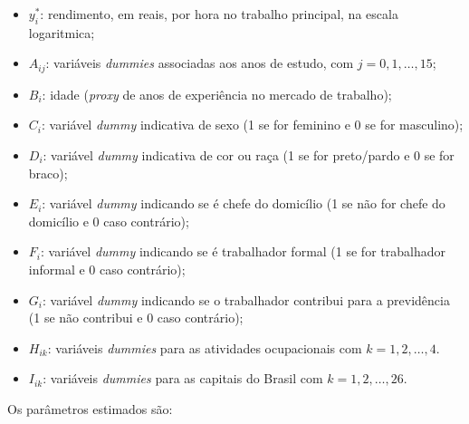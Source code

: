 \documentclass[12pt,a4paper,header]{abnt}
\begin{document}
\begin{itemize}
    \item $y_i^*$: rendimento, em reais, por hora no trabalho principal, na escala logaritmica;
    \item $A_{ij}$: variáveis \textit{dummies} associadas aos anos de estudo, com $j = 0, 1, \dots, 15$;
    \item $B_i$: idade (\textit{proxy} de anos de experiência no mercado de trabalho);
    \item $C_i$: variável \textit{dummy} indicativa de sexo (1 se for feminino e 0 se for masculino);
    \item $D_i$: variável \textit{dummy} indicativa de cor ou raça (1 se for preto/pardo e 0 se for braco);
    \item $E_i$: variável \textit{dummy} indicando se é chefe do domicílio (1 se não for chefe do domicílio e 0 caso contrário);
    \item $F_i$: variável \textit{dummy} indicando se é trabalhador formal (1 se for trabalhador informal e 0 caso contrário);
    \item $G_i$: variável \textit{dummy} indicando se o trabalhador contribui para a previdência (1 se não contribui e 0 caso contrário);
    \item $H_{ik}$: variáveis \textit{dummies} para as atividades ocupacionais com $k = 1, 2, \dots, 4$.
    \item $I_{ik}$: variáveis \textit{dummies} para as capitais do Brasil com $k = 1, 2, \dots, 26$.
\end{itemize}

\noindent Os parâmetros estimados são:
\end{document}
